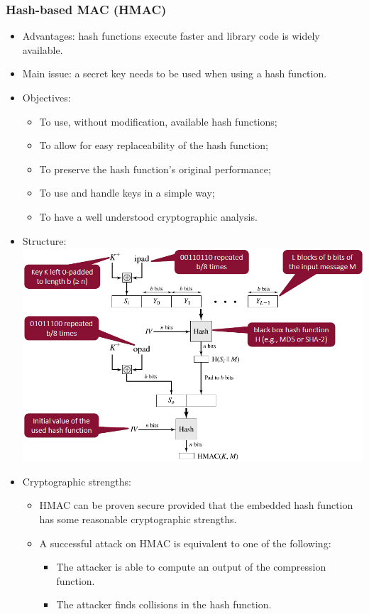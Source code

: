 \documentclass[12pt]{article}
\begin{document}
 \subsubsection{Hash-based MAC (HMAC)}
 \begin{itemize}
 	\item Advantages: hash functions execute faster and library code is widely available.
 	\item Main issue: a secret key needs to be used when using a hash function.
 	\item Objectives:
 	\begin{itemize}
 		\item To use, without modification, available hash functions;
 		\item To allow for easy replaceability of the hash function;
 		\item To preserve the hash function's original performance;
 		\item To use and handle keys in a simple way;
 		\item To have a well understood cryptographic analysis.
 	\end{itemize}
 	\item Structure: \\
 	\includegraphics[width=\linewidth]{./slides/L3P5HMAC.PNG}
 	\item Cryptographic strengths:
 	\begin{itemize}
 		\item HMAC can be proven secure provided that the embedded hash function has some reasonable cryptographic strengths.
 		\item A successful attack on HMAC is equivalent to one of the following:
 		\begin{itemize}
 			\item The attacker is able to compute an output of the compression function.
 			\item The attacker finds collisions in the hash function.
 		\end{itemize}
 	\end{itemize}
 \end{itemize}
\end{document}
